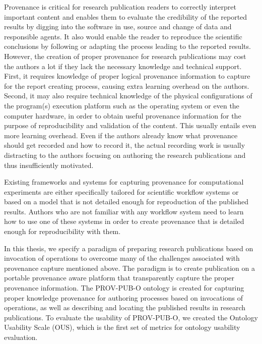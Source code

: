  

Provenance is critical for research publication readers to correctly interpret important content and enables them to evaluate the credibility of the reported results by digging into the software in use, source and change of data and responsible agents. It also would enable the reader to reproduce the scientific conclusions by following or adapting the process leading to the reported results. However, the creation of proper provenance for research publications may cost the authors a lot if they lack the necessary knowledge and technical support. First, it requires knowledge of proper logical provenance information to capture for the report creating process, causing extra learning overhead on the authors. Second, it may also require technical knowledge of the physical configurations of the program(s) execution platform such as the operating system or even the computer hardware, in order to obtain useful provenance information for the purpose of reproducibility and validation of the content. This usually entails even more learning overhead. Even if the authors already know what provenance should get recorded and how to record it, the actual recording work is usually distracting to the authors focusing on authoring the research publications and thus insufficiently motivated.

Existing frameworks and systems for capturing provenance for computational experiments are either specifically tailored for scientific workflow systems or based on a model that is not detailed enough for reproduction of the published results. Authors who are not familiar with any workflow system need to learn how to use one of these systems in order to create provenance that is detailed enough for reproducibility with them.

In this thesis, we specify a paradigm of preparing research publications based on invocation of operations to overcome many of the challenges associated with provenance capture mentioned above. The paradigm is to create publication on a portable provenance aware platform that transparently capture the proper provenance information. The PROV-PUB-O ontology is created for capturing proper knowledge provenance for authoring processes based on invocations of operations, as well as describing and locating the published results in research publications. To evaluate the usability of PROV-PUB-O, we created the Ontology Usability Scale (OUS), which is the first set of metrics for ontology usability evaluation.


